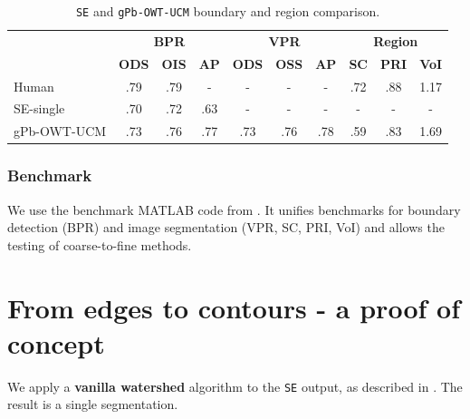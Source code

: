 \begin{table}[htbp]
\renewcommand{\arraystretch}{1.3}
\centering
\scriptsize
\begin{tabular}{l|c|c|c||c|c|c||c|c|c|}
\cline{2-10} %
\multirow{2}{*}{} & \multicolumn{3}{c||}{\textbf{BPR}} & \multicolumn{3}{c||}{\textbf{VPR}}& \multicolumn{3}{c|}{\textbf{Region}}\\
\cline{2-10}
& \textbf{ODS}  & \textbf{OIS} & \textbf{AP} %
& \textbf{ODS} & \textbf{OSS} & \textbf{AP} %
& \textbf{SC} & \textbf{PRI} & \textbf{VoI} \\
\hline
\multicolumn{1}{|l|}{Human} & .79 & .79 & - & - & - & - & .72 & .88 & 1.17 \\ %
\hline
\hline
\multicolumn{1}{|l|}{\cite{DollarICCV13edges} SE-single} & .70 & .72 & .63 & - & - & - & - & - & - \\
\hline
\multicolumn{1}{|l|}{\cite{Arbelaez11} gPb-OWT-UCM} & .73 & .76 & .77 & .73 & .76 & .78 & .59 & .83 & 1.69 \\
\hline
\end{tabular}
\caption[{\tt SE} and {\tt gPb-OWT-UCM} boundary and region comparison]{{\tt SE} and {\tt gPb-OWT-UCM} boundary and region comparison.}
\label{tab:SE_vs_gPb_OWT_UCM}
\end{table}

\subsubsection*{Benchmark}
We use the benchmark MATLAB code from \cite{Galasso13Benchmark}. %
It unifies benchmarks for boundary detection (BPR) and image segmentation (VPR, SC, %
PRI, VoI) and allows the testing of coarse-to-fine methods. %

\section{From edges to contours - a proof of concept}
\label{sec:ch5-watershed-proof-of-concept}
We apply a {\bf vanilla watershed} algorithm \cite{Beucher1992morphological,Najman1996geodesic,PINKlibrary} to the {\tt SE} output, as described in . The result is a single segmentation. 


